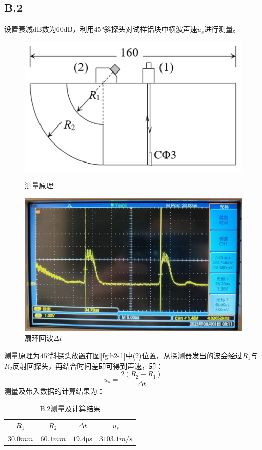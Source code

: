 \documentclass[UTF8,a4paper]{article}%
\begin{document}
\subsection*{B.2}
设置衰减$\unit{\dB}$数为$60\unit{\dB}$，利用$\ang{45}$斜探头对试样铝块中横波声速$u_s$进行测量。
\begin{figure}[H] %
    \centering
    \begin{minipage}[t]{0.5\linewidth}
        \centering
        \includegraphics[width=0.95\linewidth]{B2-1.png}
        \caption{测量原理}
        \label{fg:b2-1}
    \end{minipage}%
    \begin{minipage}[t]{0.5\linewidth}
        \centering
        \includegraphics[width=0.95\linewidth]{B2-2.jpg}
        \caption{扇环回波$\Delta t$}
        \label{fg:b2-2}
    \end{minipage}
\end{figure}
测量原理为$\ang{45}$斜探头放置在图\ref{fg:b2-1}中(2)位置，从探测器发出的波会经过$R_1$与$R_2$反射回探头，再结合时间差即可得到声速，即：
$$u_s=\frac{2(R_2-R_1)}{\Delta t}$$
测量及带入数据的计算结果为：
\begin{table}[H]
    \centering
    \caption{B.2测量及计算结果}
    \label{tab:b2}
    \begin{tabular}{cccc}
        \hline
        $R_1$           & $R_2$           & $\Delta t$                 & $u_s$              \\
        $30.0\unit{mm}$ & $60.1\unit{mm}$ & $19.4\unit{\micro\second}$ & $3103.1\unit{m/s}$ \\ \hline
    \end{tabular}
\end{table}
\end{document}
